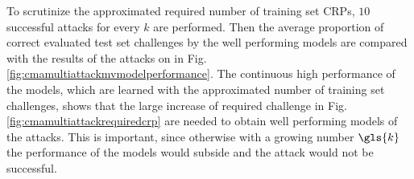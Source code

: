 To scrutinize the approximated required number of training set \acp{CRP}, $10$ successful attacks for every $k$ are performed.
Then the average proportion of correct evaluated test set challenges by the well performing models are compared with the results of the attacks on \xpufs in Fig. \ref{fig:cmamultiattackmvmodelperformance}.
The continuous high performance of the models, which are learned with the approximated number of training set challenges, shows that the large increase of required challenge in Fig. \ref{fig:cmamultiattackrequiredcrp} are needed to obtain well performing models of the attacks.
This is important, since otherwise with a growing number $\gls{k}$ the performance of the models would subside and the attack would not be successful.



